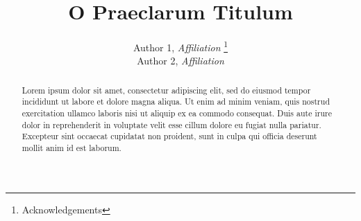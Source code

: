 \documentclass[12pt]{article}
\title{O Praeclarum Titulum}
\author{\noindent 
Author 1, \textit{Affiliation}
    \thanks{Acknowledgements}\\
Author 2, \textit{Affiliation}
}
\date{}
\begin{document}
\maketitle

\begin{abstract}
\noindent Lorem ipsum dolor sit amet, consectetur adipiscing elit, sed do eiusmod tempor incididunt ut labore et dolore magna aliqua. Ut enim ad minim veniam, quis nostrud exercitation ullamco laboris nisi ut aliquip ex ea commodo consequat. Duis aute irure dolor in reprehenderit in voluptate velit esse cillum dolore eu fugiat nulla pariatur. Excepteur sint occaecat cupidatat non proident, sunt in culpa qui officia deserunt mollit anim id est laborum.

\bigskip{}
\end{abstract}
\end{document}
